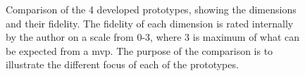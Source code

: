 \documentclass{report}
\begin{document}
\begin{figure}[h!]%
    \centering
    
    \qquad
    
    \qquad
    
    
    \caption{Comparison of the 4 developed prototypes, showing the dimensions and their fidelity. The fidelity of each dimension is rated internally by the author on a scale from 0-3, where 3 is maximum of what can be expected from a \gls{mvp}. The purpose of the comparison is to illustrate the different focus of each of the prototypes.}
    \label{fig:radar-chart}
\end{figure}
\end{document}

